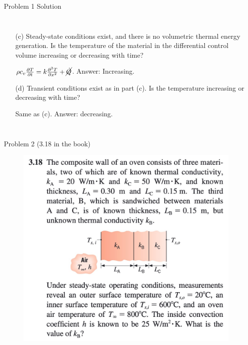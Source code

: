 \documentclass[9pt, aspectratio=169, handout]{beamer}
\begin{document}
\begin{frame}{Problem 1 Solution}
\begin{columns}
\begin{itemize}
            \item[(c)] Steady-state conditions  exist, and there is no volumetric thermal energy generation. Is the temperature of the material in the differential control volume increasing or decreasing with time?\par\pause
             $\rho c_v \frac{\partial T}{\partial t} = k\frac{\partial^2 T}{\partial x^2} + \cancel{\dot{Q}}$. Answer: Increasing.\pause
            \item[(d)] Transient conditions exist as in part (c). Is the temperature increasing or decreasing with time?\par\pause
             Same as (c). Answer: decreasing.
        \end{itemize}
    \end{columns}
\end{frame}

\begin{frame}{Problem 2 (3.18 in the book)}
    \begin{figure}
        \centering
        \includegraphics[width=.5\textwidth]{Figures/fig1.2.jpg}
    \end{figure}
\end{frame}
\end{document}
